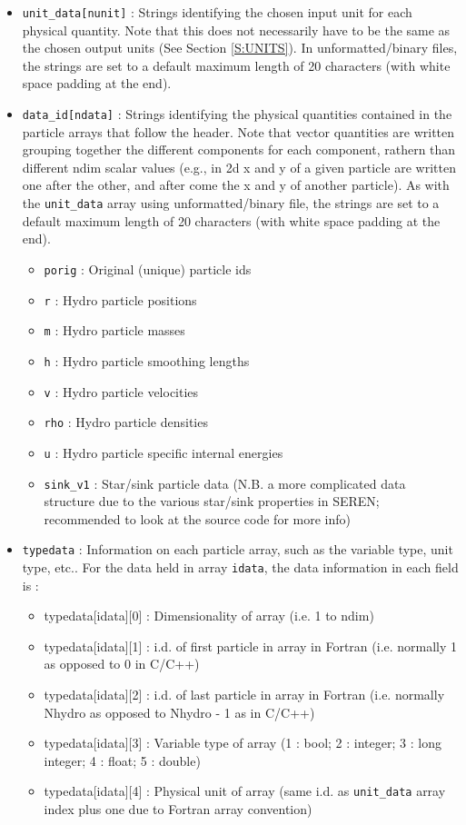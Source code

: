 \documentclass[a4paper]{article}
\newcommand{\var}[1]{\texttt{#1}}
\begin{document}
\begin{itemize}
\begin{itemize}
\end{itemize}
\item \var{unit\_data[nunit]} : Strings identifying the chosen input unit for each physical quantity.  Note that this does not necessarily have to be the same as the chosen output units (See Section \ref{S:UNITS}).  In unformatted/binary files, the strings are set to a default maximum length of 20 characters (with white space padding at the end).
\item \var{data\_id[ndata]} : Strings identifying the physical quantities contained in the particle arrays that follow the header.  Note that vector quantities are written grouping together the different components for each component, rathern than different ndim scalar values (e.g., in 2d x and y of a given particle are written one after the other, and after come the x and y of another particle). As with the \var{unit\_data} array using unformatted/binary file, the strings are set to a default maximum length of 20 characters (with white space padding at the end).
\begin{itemize}
\item \var{porig} : Original (unique) particle ids
\item \var{r} : Hydro particle positions
\item \var{m} : Hydro particle masses
\item \var{h} : Hydro particle smoothing lengths
\item \var{v} : Hydro particle velocities
\item \var{rho} : Hydro particle densities
\item \var{u} : Hydro particle specific internal energies
\item \var{sink\_v1} : Star/sink particle data (N.B. a more complicated data structure due to the various star/sink properties in SEREN; recommended to look at the source code for more info)
\end{itemize}
\item \var{typedata} : Information on each particle array, such as the variable type, unit type, etc..  For the data held in array \var{idata}, the data information in each field is :
\begin{itemize}
\item typedata[idata][0] : Dimensionality of array (i.e. 1 to ndim)
\item typedata[idata][1] : i.d. of first particle in array in Fortran (i.e. normally 1 as opposed to 0 in C/C++)
\item typedata[idata][2] : i.d. of last particle in array in Fortran (i.e. normally Nhydro as opposed to Nhydro - 1 as in C/C++)
\item typedata[idata][3] : Variable type of array (1 : bool; 2 : integer; 3 : long integer; 4 : float;  5 : double)
\item typedata[idata][4] : Physical unit of array (same i.d. as \var{unit\_data} array index plus one due to Fortran array convention)
\end{itemize}
\end{itemize}
\end{document}
